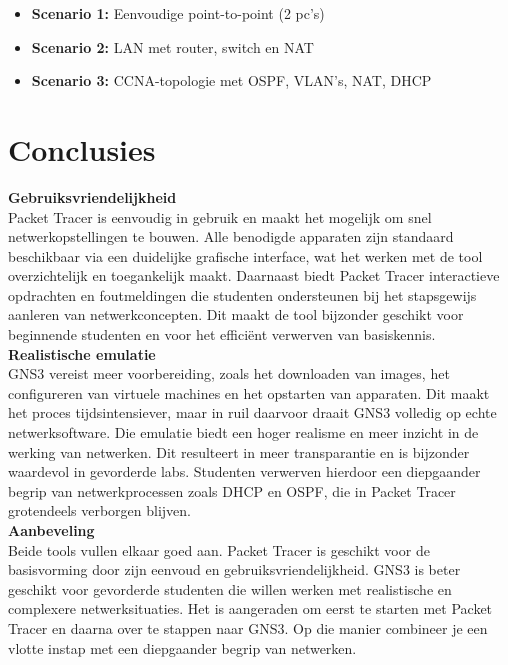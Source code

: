 \documentclass[a0,portrait]{hogent-poster}
\begin{document}
\begin{multicols}{2}
\begin{itemize}
    \item \textbf{Scenario 1:} Eenvoudige point-to-point (2 pc's)
    \item \textbf{Scenario 2:} LAN met router, switch en NAT
    \item \textbf{Scenario 3:} CCNA-topologie met OSPF, VLAN's, NAT, DHCP
    
\end{itemize}




\section{Conclusies}

\textbf{Gebruiksvriendelijkheid} \\
Packet Tracer is eenvoudig in gebruik en maakt het mogelijk om snel netwerkopstellingen te bouwen. Alle benodigde apparaten zijn standaard beschikbaar via een duidelijke grafische interface, wat het werken met de tool overzichtelijk en toegankelijk maakt. Daarnaast biedt Packet Tracer interactieve opdrachten en foutmeldingen die studenten ondersteunen bij het stapsgewijs aanleren van netwerkconcepten. Dit maakt de tool bijzonder geschikt voor beginnende studenten en voor het efficiënt verwerven van basiskennis. \\[0.1em]

\textbf{Realistische emulatie} \\
GNS3 vereist meer voorbereiding, zoals het downloaden van images, het configureren van virtuele machines en het opstarten van apparaten. Dit maakt het proces tijdsintensiever, maar in ruil daarvoor draait GNS3 volledig op echte netwerksoftware. Die emulatie biedt een hoger realisme en meer inzicht in de werking van netwerken. Dit resulteert in meer transparantie en is bijzonder waardevol in gevorderde labs. Studenten verwerven hierdoor een diepgaander begrip van netwerkprocessen zoals DHCP en OSPF, die in Packet Tracer grotendeels verborgen blijven. \\[0.1em]

\textbf{Aanbeveling} \\
Beide tools vullen elkaar goed aan. Packet Tracer is geschikt voor de basisvorming door zijn eenvoud en gebruiksvriendelijkheid. GNS3 is beter geschikt voor gevorderde studenten die willen werken met realistische en complexere netwerksituaties. Het is aangeraden om eerst te starten met Packet Tracer en daarna over te stappen naar GNS3. Op die manier combineer je een vlotte instap met een diepgaander begrip van netwerken.



\end{multicols}
\end{document}
